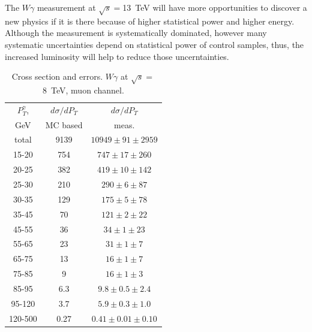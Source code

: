 The $W\gamma$ measurement at $\sqrt{s}=$13~TeV will have more opportunities to discover a new physics if it is there because of higher statistical power and higher energy. Although the measurement is systematically dominated, however many systematic uncertainties depend on statistical power of control samples, thus, the increased luminosity will help to reduce those uncerntainties.

\begin{table}[h]
  \scriptsize
  \begin{center}
  \caption{Cross section and errors. $W\gamma$ at $\sqrt{s}=$8~TeV, muon channel. }
  \begin{tabular}{|c|c|c|}
    $P_T^{\gamma}$, & $d\sigma/dP_{T}$ &$d\sigma/dP_{T}$ \\ 
    GeV & MC based &    meas.       \\ \hline
    total & 9139 & $10949 \pm 91 \pm 2959$ \\ \hline
    15-20 & 754 & $747 \pm 17 \pm 260$ \\ \hline
    20-25 & 382 & $419 \pm 10 \pm 142$ \\ \hline
    25-30 & 210 & $290 \pm 6 \pm 87$ \\ \hline
    30-35 & 129 & $175 \pm 5 \pm 78$ \\ \hline
    35-45 & 70 & $121 \pm 2 \pm 22$ \\ \hline
    45-55 & 36 & $34 \pm 1 \pm 23$ \\ \hline
    55-65 & 23 & $31 \pm 1 \pm 7$ \\ \hline
    65-75 & 13 & $16 \pm 1 \pm 7$ \\ \hline
    75-85 & 9 & $16 \pm 1 \pm 3$ \\ \hline
    85-95 & 6.3 & $9.8 \pm 0.5 \pm 2.4$ \\ \hline
    95-120 & 3.7 & $5.9 \pm 0.3 \pm 1.0$ \\ \hline
    120-500 & 0.27 & $0.41 \pm 0.01 \pm 0.10$ \\ \hline
  \end{tabular}
  \label{tab:sc_mc_vs_meas_MUON_WGamma}
  \end{center}
\end{table}


